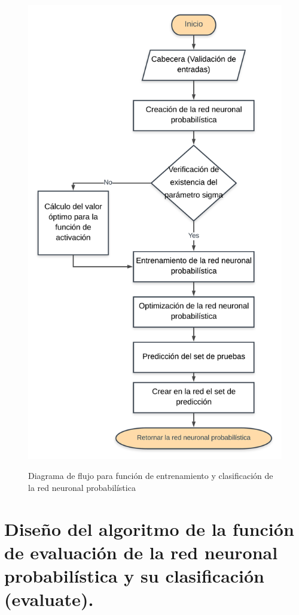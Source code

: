 \begin{figure}[h]
	\caption{Diagrama de flujo para función de entrenamiento y clasificación de la red neuronal probabilística}
	\centering
	\includegraphics[scale=0.1]{trainNeuralNet.png}
	\label{fig:trainNeuralNet}
\end{figure}

\section{Diseño del algoritmo de la función de evaluación de la red neuronal probabilística y su clasificación (evaluate).}

